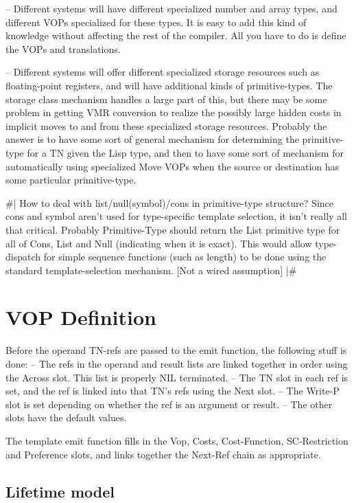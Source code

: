  -- Different systems will have different specialized number and array types,
    and different VOPs specialized for these types.  It is easy to add this kind
    of knowledge without affecting the rest of the compiler.  All you have to
    do is define the VOPs and translations.

 -- Different systems will offer different specialized storage resources
    such as floating-point registers, and will have additional kinds of
    primitive-types.  The storage class mechanism handles a large part of this,
    but there may be some problem in getting VMR conversion to realize the
    possibly large hidden costs in implicit moves to and from these specialized
    storage resources.  Probably the answer is to have some sort of general
    mechanism for determining the primitive-type for a TN given the Lisp type,
    and then to have some sort of mechanism for automatically using specialized
    Move VOPs when the source or destination has some particular primitive-type.

\#|
How to deal with list/null(symbol)/cons in primitive-type structure?  Since
cons and symbol aren't used for type-specific template selection, it isn't
really all that critical.  Probably Primitive-Type should return the List
primitive type for all of Cons, List and Null (indicating when it is exact).
This would allow type-dispatch for simple sequence functions (such as length)
to be done using the standard template-selection mechanism.  [Not a wired
assumption] 
|\#



\chapter{VOP Definition}

Before the operand TN-refs are passed to the emit function, the following
stuff is done:
 -- The refs in the operand and result lists are linked together in order using
    the Across slot.  This list is properly NIL terminated.
 -- The TN slot in each ref is set, and the ref is linked into that TN's refs
    using the Next slot.
 -- The Write-P slot is set depending on whether the ref is an argument or
    result.
 -- The other slots have the default values.

The template emit function fills in the Vop, Costs, Cost-Function,
SC-Restriction and Preference slots, and links together the Next-Ref chain as
appropriate.


\section{Lifetime model}

